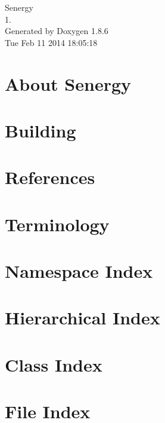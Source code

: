 \documentclass[twoside]{book}
\newcommand{\clearemptydoublepage}{%
  \newpage{\pagestyle{empty}\cleardoublepage}%
}
\begin{document}
\hypersetup{pageanchor=false}
\begin{titlepage}
\vspace*{7cm}
\begin{center}%
{\Large Senergy \\[1ex]\large 1. }\\
\vspace*{1cm}
{\large Generated by Doxygen 1.8.6}\\
\vspace*{0.5cm}
{\small Tue Feb 11 2014 18:05:18}\\
\end{center}
\end{titlepage}
\clearemptydoublepage
\tableofcontents
\clearemptydoublepage
{}
\hypersetup{pageanchor=true}

\chapter{About Senergy}
\label{index}\hypertarget{index}{}
\chapter{Building}
\label{building}
\hypertarget{building}{}

\chapter{References}
\label{references}
\hypertarget{references}{}

\chapter{Terminology}
\label{terminology}
\hypertarget{terminology}{}

\chapter{Namespace Index}

\chapter{Hierarchical Index}

\chapter{Class Index}

\chapter{File Index}

\end{document}
